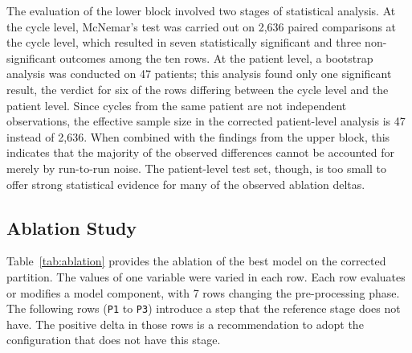 \documentclass[journal,onecolumn]{IEEEtran}
\begin{document}
The evaluation of the lower block involved two stages of statistical analysis. At the cycle level, McNemar's test was carried out on 2,636 paired comparisons at the cycle level, which resulted in seven statistically significant and three non-significant outcomes among the ten rows. At the patient level, a bootstrap analysis was conducted on 47 patients; this analysis found only one significant result, the verdict for six of the rows differing between the cycle level and the patient level. Since cycles from the same patient are not independent observations, the effective sample size in the corrected patient-level analysis is 47 instead of 2,636. When combined with the findings from the upper block, this indicates that the majority of the observed differences cannot be accounted for merely by run-to-run noise. The patient-level test set, though, is too small to offer strong statistical evidence for many of the observed ablation deltas.

\subsection{Ablation Study}
\label{subsec:ablation}

Table~\ref{tab:ablation} provides the ablation of the best model on the corrected partition. The values of one variable were varied in each row. Each row evaluates or modifies a model component, with 7 rows changing the pre-processing phase. The following rows (\texttt{P1} to \texttt{P3}) introduce a step that the reference stage does not have. The positive delta in those rows is a recommendation to adopt the configuration that does not have this stage.
\end{document}
